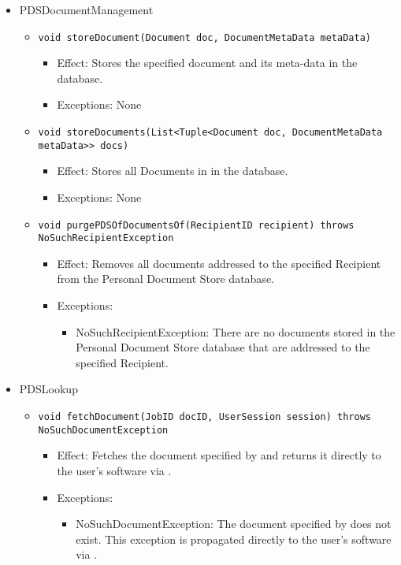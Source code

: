 \begin{itemize}
	\item PDSDocumentManagement
	\begin{itemize}
		\item \texttt{void storeDocument(Document doc, DocumentMetaData metaData)}
		\begin{itemize}
			\item Effect: Stores the specified document and its meta-data in the database.
			\item Exceptions: None
		\end{itemize}

		\item \texttt{void storeDocuments(List<Tuple<Document doc, DocumentMetaData metaData>> docs)}
		\begin{itemize}
			\item Effect: Stores all Documents in  in the database.
			\item Exceptions: None
		\end{itemize}

		\item \texttt{void purgePDSOfDocumentsOf(RecipientID recipient) throws NoSuchRecipientException}
		\begin{itemize}
			\item Effect: Removes all documents addressed to the specified Recipient from the Personal Document Store database.
			\item Exceptions:
			\begin{itemize}
				\item NoSuchRecipientException: There are no documents stored in the Personal Document Store database that are addressed to the specified Recipient.
			\end{itemize}
		\end{itemize}
	\end{itemize}

    \item PDSLookup
	\begin{itemize}
		\item \texttt{void fetchDocument(JobID docID, UserSession session) throws NoSuchDocumentException}
		\begin{itemize}
			\item Effect: Fetches the document specified by  and returns it directly to the user's software via .
			\item Exceptions:
			\begin{itemize}
				\item NoSuchDocumentException: The document specified by  does not exist. This exception is propagated directly to the user's software via .
			\end{itemize}
		\end{itemize}
				

\end{itemize}
\end{itemize}

